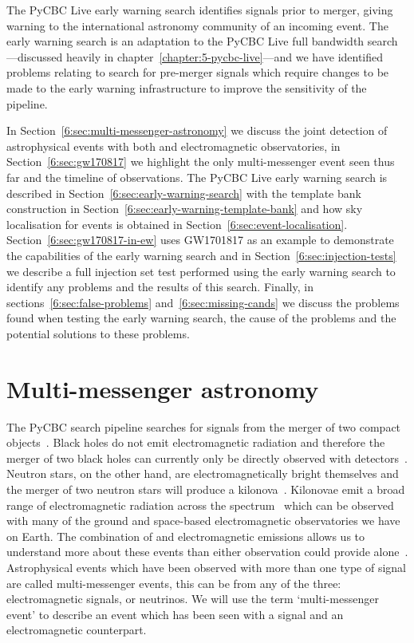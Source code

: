 

The PyCBC Live early warning search identifies \gwadj signals prior to merger, giving warning to the international astronomy community of an incoming \gwadj event. The early warning search is an adaptation to the PyCBC Live full bandwidth search---discussed heavily in chapter~\ref{chapter:5-pycbc-live}---and we have identified problems relating to search for pre-merger signals which require changes to be made to the early warning infrastructure to improve the sensitivity of the pipeline.

In Section~\ref{6:sec:multi-messenger-astronomy} we discuss the joint detection of astrophysical events with both \gw and electromagnetic observatories, in Section~\ref{6:sec:gw170817} we highlight the only multi-messenger event seen thus far and the timeline of observations. The PyCBC Live early warning search is described in Section~\ref{6:sec:early-warning-search} with the template bank construction in Section~\ref{6:sec:early-warning-template-bank} and how sky localisation for events is obtained in Section~\ref{6:sec:event-localisation}. Section~\ref{6:sec:gw170817-in-ew} uses GW1701817 as an example to demonstrate the capabilities of the early warning search and in Section~\ref{6:sec:injection-tests} we describe a full injection set test performed using the early warning search to identify any problems and the results of this search. Finally, in sections~\ref{6:sec:false-problems} and~\ref{6:sec:missing-cands} we discuss the problems found when testing the early warning search, the cause of the problems and the potential solutions to these problems.

\section{\label{6:sec:multi-messenger-astronomy}Multi-messenger astronomy}

The PyCBC \gwadj search pipeline searches for \gwadj signals from the merger of two compact objects~\cite{PyCBC:2016}. Black holes do not emit electromagnetic radiation and therefore the merger of two black holes can currently only be directly observed with \gwadj detectors~\cite{Ghez:2000}. Neutron stars, on the other hand, are electromagnetically bright themselves and the merger of two neutron stars will produce a kilonova~\cite{Kilonovae:2017}. Kilonovae emit a broad range of electromagnetic radiation across the spectrum~\cite{kilonova_lightcurve:2017} which can be observed with many of the ground and space-based electromagnetic observatories we have on Earth. The combination of \gw and electromagnetic emissions allows us to understand more about these events than either observation could provide alone~\cite{multi_mess_astro:2019}. Astrophysical events which have been observed with more than one type of signal are called multi-messenger events, this can be from any of the three: electromagnetic signals, \gws or neutrinos. We will use the term `multi-messenger event' to describe an event which has been seen with a \gwadj signal and an electromagnetic counterpart.

